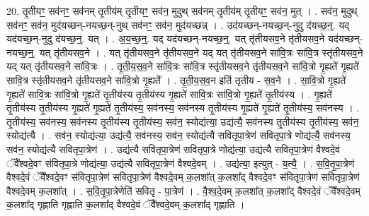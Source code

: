 \documentclass[17pt]{extarticle}
\begin{document}
20. तृ॒तीयꣳ॒॒ सव॑नꣳ॒॒ सव॑नम् तृ॒तीय॑म् तृ॒तीयꣳ॒॒ सव॑न॒ मुदुथ् सव॑नम् तृ॒तीय॑म् तृ॒तीयꣳ॒॒ सव॑न॒ मुत् । . सव॑न॒ मुदुथ् सव॑नꣳ॒॒ सव॑न॒ मुद॑यच्छन्-नयच्छ॒न्-नुथ् सव॑नꣳ॒॒ सव॑न॒ मुद॑यच्छन्न् । . उद॑यच्छन्-नयच्छ॒न्-नुदु द॑यच्छ॒न्॒. यद् यद॑यच्छ॒न्-नुदु द॑यच्छ॒न्॒. यत् । . अ॒य॒च्छ॒न्॒. यद् यद॑यच्छन्-नयच्छ॒न्॒. यत् तृ॑तीयसव॒ने तृ॑तीयसव॒ने यद॑यच्छन्-नयच्छ॒न्॒. यत् तृ॑तीयसव॒ने । . यत् तृ॑तीयसव॒ने तृ॑तीयसव॒ने यद् यत् तृ॑तीयसव॒ने सा॑वि॒त्रः सा॑वि॒त्र स्तृ॑तीयसव॒ने यद् यत् तृ॑तीयसव॒ने सा॑वि॒त्रः । . तृ॒ती॒य॒स॒व॒ने सा॑वि॒त्रः सा॑वि॒त्र स्तृ॑तीयसव॒ने तृ॑तीयसव॒ने सा॑वि॒त्रो गृ॒ह्यते॑ गृ॒ह्यते॑ सावि॒त्र स्तृ॑तीयसव॒ने तृ॑तीयसव॒ने सा॑वि॒त्रो गृ॒ह्यते᳚ । . तृ॒ती॒य॒स॒व॒न इति॑ तृतीय - स॒व॒ने । . सा॒वि॒त्रो गृ॒ह्यते॑ गृ॒ह्यते॑ सावि॒त्रः सा॑वि॒त्रो गृ॒ह्यते॑ तृ॒तीय॑स्य तृ॒तीय॑स्य गृ॒ह्यते॑ सावि॒त्रः सा॑वि॒त्रो गृ॒ह्यते॑ तृ॒तीय॑स्य । . गृ॒ह्यते॑ तृ॒तीय॑स्य तृ॒तीय॑स्य गृ॒ह्यते॑ गृ॒ह्यते॑ तृ॒तीय॑स्य॒ सव॑नस्य॒ सव॑नस्य तृ॒तीय॑स्य गृ॒ह्यते॑ गृ॒ह्यते॑ तृ॒तीय॑स्य॒ सव॑नस्य । . तृ॒तीय॑स्य॒ सव॑नस्य॒ सव॑नस्य तृ॒तीय॑स्य तृ॒तीय॑स्य॒ सव॑न॒ स्योद्य॑त्या॒ उद्य॑त्यै॒ सव॑नस्य तृ॒तीय॑स्य तृ॒तीय॑स्य॒ सव॑न॒ स्योद्य॑त्यै । . सव॑न॒ स्योद्य॑त्या॒ उद्य॑त्यै॒ सव॑नस्य॒ सव॑न॒ स्योद्य॑त्यै सवितृपा॒त्रेण॑ सवितृपा॒त्रे णोद्य॑त्यै॒ सव॑नस्य॒ सव॑न॒ स्योद्य॑त्यै सवितृपा॒त्रेण॑ । . उद्य॑त्यै सवितृपा॒त्रेण॑ सवितृपा॒त्रे णोद्य॑त्या॒ उद्य॑त्यै सवितृपा॒त्रेण॑ वैश्वदे॒वं ॅवै᳚श्वदे॒वꣳ स॑वितृपा॒त्रे णोद्य॑त्या॒ उद्य॑त्यै सवितृपा॒त्रेण॑ वैश्वदे॒वम् । . उद्य॑त्या॒ इत्युत् - य॒त्यै॒ । . स॒वि॒तृ॒पा॒त्रेण॑ वैश्वदे॒वं ॅवै᳚श्वदे॒वꣳ स॑वितृपा॒त्रेण॑ सवितृपा॒त्रेण॑ वैश्वदे॒वम् क॒लशा᳚त् क॒लशा᳚द् वैश्वदे॒वꣳ स॑वितृपा॒त्रेण॑ सवितृपा॒त्रेण॑ वैश्वदे॒वम् क॒लशा᳚त् । . स॒वि॒तृ॒पा॒त्रेणेति॑ सवितृ - पा॒त्रेण॑ । . वै॒श्व॒दे॒वम् क॒लशा᳚त् क॒लशा᳚द् वैश्वदे॒वं ॅवै᳚श्वदे॒वम् क॒लशा᳚द् गृह्णाति गृह्णाति क॒लशा᳚द् वैश्वदे॒वं ॅवै᳚श्वदे॒वम् क॒लशा᳚द् गृह्णाति । \newline
\end{document}
